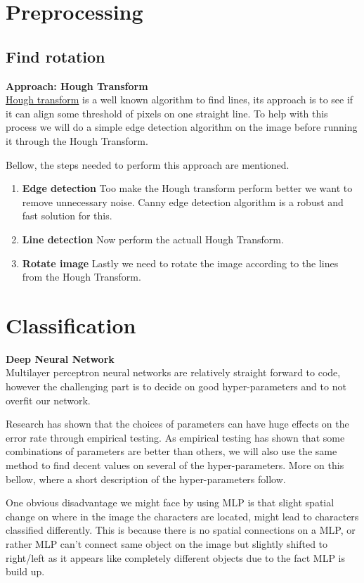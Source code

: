 \documentclass[Report.tex]{subfiles}
\begin{document}
\section{Preprocessing}
\subsection{Find rotation}

\begin{flushleft}
  \textbf{Approach: Hough Transform} \\
  \href{https://en.wikipedia.org/wiki/Hough_transform}{Hough transform} is a well known algorithm to find lines, its approach is to see if it can align some threshold of pixels on one straight line. To help with this process we will do a simple edge detection algorithm on the image before running it through the Hough Transform. \par Bellow, the steps needed to perform this approach are mentioned.

  \begin{enumerate}
    \item \textbf{Edge detection}
    Too make the Hough transform perform better we want to remove unnecessary noise. Canny edge detection algorithm is a robust and fast solution for this.
    \item \textbf{Line detection}
    Now perform the actuall Hough Transform.
    \item \textbf{Rotate image}
    Lastly we need to rotate the image according to the lines from the Hough Transform.
  \end{enumerate}
\end{flushleft}

\section{Classification}
\label{sec:Discarded Method:Classification}

\begin{flushleft}
  \textbf{Deep Neural Network} \\
  Multilayer perceptron neural networks are relatively straight
  forward to code, however the challenging part is to decide on good hyper-parameters and to not overfit our network. \par
  Research has shown that the choices of parameters can have huge effects on the error rate through empirical testing. As empirical testing has shown that some combinations of parameters are better than others, we will also use the same method to find decent values on several of the hyper-parameters. More on this bellow, where a short description of the hyper-parameters follow. \par
  One obvious disadvantage we might face by using MLP is that slight spatial change on where in the image the characters are located, might lead to characters classified differently. This is because there is no spatial connections on a MLP, or rather MLP can't connect same object on the image but slightly shifted to right/left as it appears like completely different objects due to the fact MLP is build up.
\end{flushleft}
\end{document}
